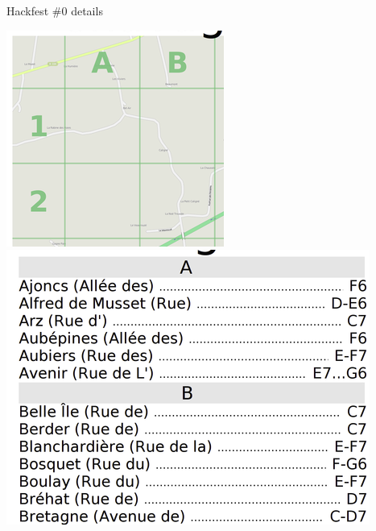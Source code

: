 \documentclass{beamer}
\begin{document}
\begin{frame}{Hackfest \#0 details}
  \begin{center}
    \includegraphics[height=0.5\textheight]{chavagne_detail.png}
    \includegraphics[height=0.5\textheight]{chavagne_index_detail.png}
  \end{center}
\end{frame}
\end{document}
